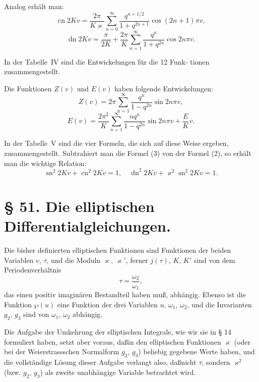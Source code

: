\documentclass[12pt,a4paper]{article}
\theoremstyle{definition}
\begin{document}
Analog erh\"{a}lt man:
\begin{equation}\tag{3}
\operatorname{cn} 2Kv = \frac{2\pi}{K\varkappa} \sum_{n=0}^\infty \frac{q^{n+1/2}}{1 + q^{2n+1}} \cos(2n+1)\pi v,
\end{equation}
\begin{equation}\tag{4}
\operatorname{dn} 2Kv = \frac{\pi}{2K} + \frac{2\pi}{K} \sum_{n=1}^\infty \frac{q^n}{1 + q^{2n}} \cos 2n\pi v.
\end{equation}

In der Tabelle~IV sind die Entwickelungen f\"{u}r die 12 Funk-
tionen zusammengestellt.

Die Funktionen $Z(v)$ und $E(v)$ haben folgende Entwickelungen:
\begin{equation}\tag{5}
Z(v) = 2\pi \sum_{n=1}^\infty \frac{q^n}{1 - q^{2n}} \sin 2n\pi v,
\end{equation}
\begin{equation}\tag{6}
E(v) = \frac{2\pi^2}{K} \sum_{n=1}^\infty \frac{nq^n}{1 - q^{2n}} \sin 2n\pi v + \frac{E}{K}v.
\end{equation}

In der Tabelle~V sind die vier Formeln, die sich auf diese
Weise ergeben, zusammengestellt. Subtrahiert man die Formel (3)
von der Formel (2), so erh\"{a}lt man die wichtige Relation:
\begin{equation}\tag{7}
\operatorname{sn}^2 2Kv + \operatorname{cn}^2 2Kv = 1, \quad
\operatorname{dn}^2 2Kv + \varkappa^2 \operatorname{sn}^2 2Kv = 1.
\end{equation}

\section*{\S{} 51. Die elliptischen Differentialgleichungen.}

Die bisher definierten elliptischen Funktionen sind Funktionen
der beiden Variablen $v$, $\tau$, und die Moduln $\varkappa$, $\varkappa'$, ferner $j(\tau)$,
$K$, $K'$ sind von dem Periodenverh\"{a}ltnis
\[
\tau = \frac{\omega_2}{\omega_1},
\]
das einen positiv imagin\"{a}ren Bestandteil haben mu\ss, abh\"{a}ngig.
Ebenso ist die Funktion $\wp(u)$ eine Funktion der drei Variablen
$u$, $\omega_1$, $\omega_2$, und die Invarianten $g_2$, $g_3$ sind von $\omega_1$, $\omega_2$
abh\"{a}ngig.

Die Aufgabe der Umkehrung der elliptischen Integrale, wie
wir sie in \S{} 14 formuliert haben, setzt aber voraus, da\ss in den
elliptischen Funktionen $\varkappa$ (oder bei der Weierstrassschen Normalform
$g_2$, $g_3$) beliebig gegebene Werte haben, und die vollst\"{a}ndige L\"{o}sung
dieser Aufgabe verlangt also, da\ss nicht $\tau$, sondern $\varkappa^2$ (bzw. $g_2$, $g_3$)
als zweite unabh\"{a}ngige Variable betrachtet wird.
\end{document}
